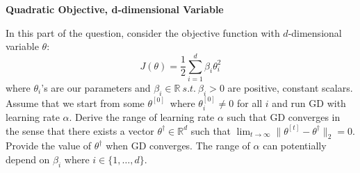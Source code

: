 \item {} {\bf Quadratic Objective, d-dimensional Variable}

In this part of the question, consider the objective function with $d$-dimensional variable $\theta$:
\begin{equation*}
	J(\theta) = \frac{1}{2}\sum_{i=1}^d \beta_i\theta_i^2
\end{equation*}
where $\theta_i$'s are our parameters and $\beta_i\in \mathbb{R}\ s.t.\ \beta_i > 0$ are positive, constant scalars.
Assume that we start from some $\theta^{[0]}$\ where	$\theta_i^{[0]} \neq 0$ for all $i$ and run GD with learning rate $\alpha$. Derive the range of learning rate $\alpha$ such that GD converges in the sense that there exists a vector $\theta^\dagger\in \mathbb{R}^d$ such that $\lim_{t\to\infty} \|\theta^{[t]}-\theta^\dagger\|_2 = 0$.   Provide the value of $\theta^\dagger$ when GD converges. The range of $\alpha$ can potentially depend on $\beta_i$ where $i \in \{1,\dots,d\}$. 
